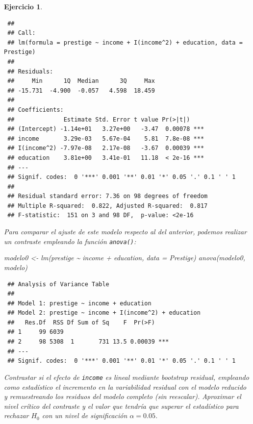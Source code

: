 \documentclass[
  10pt,
]{book}
\newenvironment{Shaded}{\begin{snugshade}}{\end{snugshade}}
\newcommand{\AttributeTok}[1]{\textcolor[rgb]{0.77,0.63,0.00}{#1}}
\newcommand{\FunctionTok}[1]{\textcolor[rgb]{0.00,0.00,0.00}{#1}}
\newcommand{\NormalTok}[1]{#1}
\newcommand{\OtherTok}[1]{\textcolor[rgb]{0.56,0.35,0.01}{#1}}
\newcommand{\SpecialCharTok}[1]{\textcolor[rgb]{0.00,0.00,0.00}{#1}}
\theoremstyle{break}
\newtheorem{exercise}{Ejercicio}[chapter]
\theoremstyle{nonumberplain}
\begin{document}
\begin{exercise}
\begin{verbatim}
 ## 
 ## Call:
 ## lm(formula = prestige ~ income + I(income^2) + education, data = Prestige)
 ## 
 ## Residuals:
 ##     Min      1Q  Median      3Q     Max 
 ## -15.731  -4.900  -0.057   4.598  18.459 
 ## 
 ## Coefficients:
 ##              Estimate Std. Error t value Pr(>|t|)    
 ## (Intercept) -1.14e+01   3.27e+00   -3.47  0.00078 ***
 ## income       3.29e-03   5.67e-04    5.81  7.8e-08 ***
 ## I(income^2) -7.97e-08   2.17e-08   -3.67  0.00039 ***
 ## education    3.81e+00   3.41e-01   11.18  < 2e-16 ***
 ## ---
 ## Signif. codes:  0 '***' 0.001 '**' 0.01 '*' 0.05 '.' 0.1 ' ' 1
 ## 
 ## Residual standard error: 7.36 on 98 degrees of freedom
 ## Multiple R-squared:  0.822, Adjusted R-squared:  0.817 
 ## F-statistic:  151 on 3 and 98 DF,  p-value: <2e-16
\end{verbatim}

Para comparar el ajuste de este modelo respecto al del anterior, podemos
realizar un contraste empleando la función \texttt{anova()}:

\begin{Shaded}
\begin{Highlighting}[]
\NormalTok{modelo0 }\OtherTok{\textless{}{-}} \FunctionTok{lm}\NormalTok{(prestige }\SpecialCharTok{\textasciitilde{}}\NormalTok{ income }\SpecialCharTok{+}\NormalTok{ education, }\AttributeTok{data =}\NormalTok{ Prestige)}
\FunctionTok{anova}\NormalTok{(modelo0, modelo)}
\end{Highlighting}
\end{Shaded}

\begin{verbatim}
 ## Analysis of Variance Table
 ## 
 ## Model 1: prestige ~ income + education
 ## Model 2: prestige ~ income + I(income^2) + education
 ##   Res.Df  RSS Df Sum of Sq    F  Pr(>F)    
 ## 1     99 6039                              
 ## 2     98 5308  1       731 13.5 0.00039 ***
 ## ---
 ## Signif. codes:  0 '***' 0.001 '**' 0.01 '*' 0.05 '.' 0.1 ' ' 1
\end{verbatim}

Contrastar si el efecto de \texttt{income} es lineal mediante bootstrap residual,
empleando como estadístico el incremento en la variabilidad residual con el
modelo reducido y remuestreando los residuos del modelo completo (sin reescalar).
Aproximar el nivel crítico del contraste y el valor que tendría que superar el
estadístico para rechazar \(H_0\) con un nivel de significación \(\alpha = 0.05\).
\end{exercise}
\end{document}

